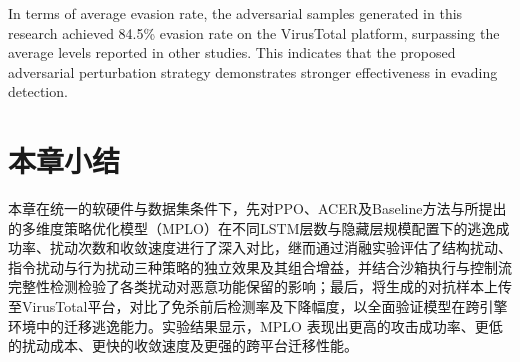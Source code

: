 In terms of average evasion rate, the adversarial samples generated in this research achieved 84.5\% evasion rate on the VirusTotal platform, surpassing the average levels reported in other studies. This indicates that the proposed adversarial perturbation strategy demonstrates stronger effectiveness in evading detection.

\section{本章小结}

本章在统一的软硬件与数据集条件下，先对PPO、ACER及Baseline方法与所提出的多维度策略优化模型（MPLO）在不同LSTM层数与隐藏层规模配置下的逃逸成功率、扰动次数和收敛速度进行了深入对比，继而通过消融实验评估了结构扰动、指令扰动与行为扰动三种策略的独立效果及其组合增益，并结合沙箱执行与控制流完整性检测检验了各类扰动对恶意功能保留的影响；最后，将生成的对抗样本上传至VirusTotal平台，对比了免杀前后检测率及下降幅度，以全面验证模型在跨引擎环境中的迁移逃逸能力。实验结果显示，MPLO 表现出更高的攻击成功率、更低的扰动成本、更快的收敛速度及更强的跨平台迁移性能。



